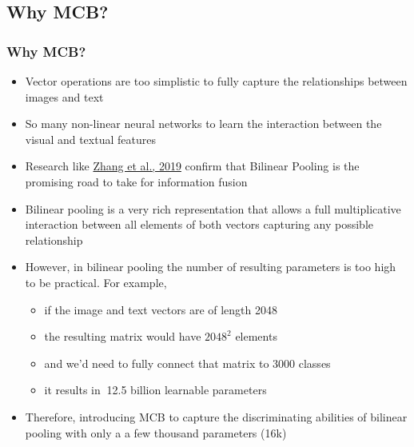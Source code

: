 \documentclass{beamer}
\begin{document}

\subsection{Why MCB?}

\begin{frame}
\frametitle{Why MCB?}
\begin{itemize}
\item Vector operations are too simplistic to fully capture the relationships between images and text
\item So many non-linear neural networks to learn the interaction between the visual and textual features
\item Research like \href{https://www.sciencedirect.com/science/article/pii/S1566253518308893}{\color{blue}Zhang et al., 2019} \color{black}confirm that Bilinear Pooling is the promising road to take for information fusion
\item Bilinear pooling is a very rich representation that allows a full multiplicative interaction between all elements of both vectors capturing any possible relationship
\item However, in bilinear pooling  the number of resulting parameters is too high to be practical. For example,
\begin{itemize}
\item if the image and text vectors are of length 2048
\item the resulting matrix would have \begin{math}2048^{2}\end{math} elements
\item and we’d need to fully connect that matrix to 3000 classes
\item it results in \begin{math}~\end{math}12.5 billion learnable parameters
\end{itemize}
\item Therefore, introducing MCB to capture the discriminating abilities of bilinear pooling with only a a few thousand parameters (16k)
\end{itemize}
\end{frame}

\end{document}
